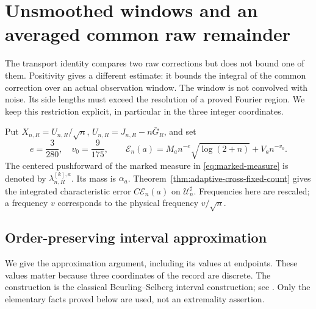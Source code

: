 \section{Unsmoothed windows and an averaged common raw remainder}
\label{sec:unsmoothed-window-remainders}
The transport identity compares two raw corrections but does not bound
one of them. Positivity gives a different estimate: it bounds the
integral of the common correction over an actual observation window.
The window is not convolved with noise. Its side lengths must exceed
the resolution of a proved Fourier region. We keep this restriction
explicit, in particular in the three integer coordinates.

Put $X_{n,R}=U_{n,R}/\sqrt n$, $U_{n,R}=J_{n,R}-n\bar G_R$, and set
\begin{equation}\label{eq:window-Fourier-error}
 e=\frac3{280},\quad v_0=\frac9{175},\qquad
 \mathcal E_n(a)=M_an^{-e}\sqrt{\log(2+n)}+V_an^{-v_0}.
\end{equation}
The centered pushforward of the marked measure in
\eqref{eq:marked-measure} is denoted by $\lambda_{n,R}^{[k],a}$.
Its mass is $\alpha_a$. Theorem~\ref{thm:adaptive-cross-fixed-count}
gives the integrated characteristic error $C\mathcal E_n(a)$ on
$\mathcal U_n^\sharp$. Frequencies here are rescaled; a frequency $v$
corresponds to the physical frequency $v/\sqrt n$.

\subsection{Order-preserving interval approximation}
We give the approximation argument, including its values at endpoints.
These values matter because three coordinates of the record are discrete.
The construction is the classical Beurling--Selberg interval construction;
see \cite[Introduction]{CVExt}. Only the elementary facts proved below
are used, not an extremality assertion.

